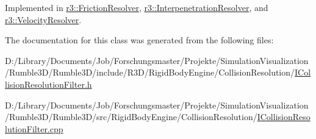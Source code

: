 Implemented in \mbox{\hyperlink{classr3_1_1_friction_resolver_af26a84959e95749088f713176ec3c096}{r3\+::\+Friction\+Resolver}}, \mbox{\hyperlink{classr3_1_1_interpenetration_resolver_a7c896a7e8e0321c9f26b3d9c616d16ee}{r3\+::\+Interpenetration\+Resolver}}, and \mbox{\hyperlink{classr3_1_1_velocity_resolver_a93e8859d1ab3407b073328a58b7caeef}{r3\+::\+Velocity\+Resolver}}.



The documentation for this class was generated from the following files\+:\begin{DoxyCompactItemize}
\item 
D\+:/\+Library/\+Documents/\+Job/\+Forschungsmaster/\+Projekte/\+Simulation\+Visualization/\+Rumble3\+D/\+Rumble3\+D/include/\+R3\+D/\+Rigid\+Body\+Engine/\+Collision\+Resolution/\mbox{\hyperlink{_i_collision_resolution_filter_8h}{I\+Collision\+Resolution\+Filter.\+h}}\item 
D\+:/\+Library/\+Documents/\+Job/\+Forschungsmaster/\+Projekte/\+Simulation\+Visualization/\+Rumble3\+D/\+Rumble3\+D/src/\+Rigid\+Body\+Engine/\+Collision\+Resolution/\mbox{\hyperlink{_i_collision_resolution_filter_8cpp}{I\+Collision\+Resolution\+Filter.\+cpp}}\end{DoxyCompactItemize}
